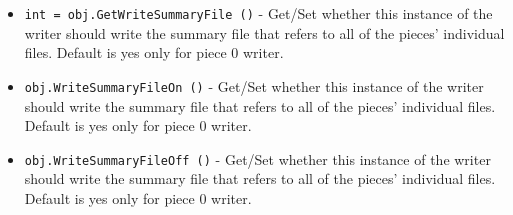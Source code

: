 \begin{itemize}
\item  \verb|int = obj.GetWriteSummaryFile ()| -  Get/Set whether this instance of the writer should write the
 summary file that refers to all of the pieces' individual files.
 Default is yes only for piece 0 writer.

\item  \verb|obj.WriteSummaryFileOn ()| -  Get/Set whether this instance of the writer should write the
 summary file that refers to all of the pieces' individual files.
 Default is yes only for piece 0 writer.

\item  \verb|obj.WriteSummaryFileOff ()| -  Get/Set whether this instance of the writer should write the
 summary file that refers to all of the pieces' individual files.
 Default is yes only for piece 0 writer.

\end{itemize}
